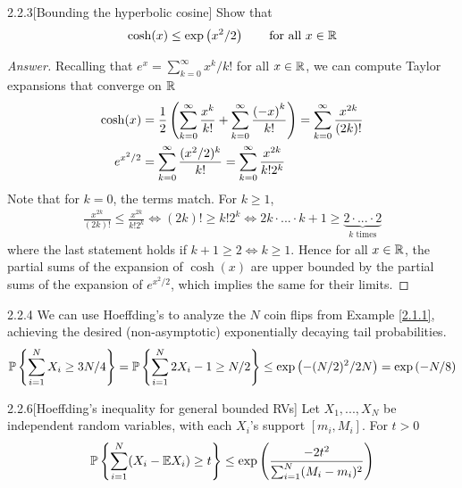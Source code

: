 {\begin{ex}{2.2.3}[Bounding the hyperbolic cosine]\label{2.2.3}
Show that
\begin{align*} 
    \cosh(x) \leq \exp\left(x^2/2\right) \qquad\text{for all $x\in \mathbb{R}$}
\end{align*}
\end{ex}
\begin{proof}[Answer]
    Recalling that $e^x = \sum_{k=0}^\infty x^k/k!$ for all $x\in \mathbb{R}$, we can compute Taylor expansions that converge on $\mathbb{R}$
\begin{align*}
    \cosh(x) &= \frac 1 2 \left(\sum_{k=0}^\infty \frac {x^k} {k!} + \sum_{k=0}^\infty \frac {{(-x)}^k} {k!} \right) = \sum_{k=0}^\infty \frac {x^{2k}} {(2k)!} \\
    e^{x^2/2} &= \sum_{k=0}^\infty \frac {(x^2/2)^k} {k!} = \sum_{k=0}^\infty \frac {x^{2k}}{k! 2^k}
\end{align*}
Note that for $k=0$, the terms match. For $k \geq 1$, 
\begin{align*}
    \frac {x^{2k}} {(2k)!} \le \frac {x^{2k}} {k!2^k} \iff (2k)! \geq k!2^k \iff 2k \cdot ... \cdot k+1 \geq \underbrace{2 \cdot ... \cdot 2}_{\text{$k$ times}}
\end{align*}
where the last statement holds if $k+1 \geq 2 \iff k \geq 1$. Hence for all $x \in \mathbb{R}$, the partial sums of the expansion of $\cosh(x)$ are upper bounded by the partial sums of the expansion of $e^{x^2/2}$, which implies the same for their limits.
\end{proof}

\begin{rmk}{2.2.4} We can use Hoeffding's to analyze the $N$ coin flips from Example \ref{2.1.1}, achieving the desired (non-asymptotic) exponentially decaying tail probabilities.
\begin{align*}
    \mathbb{P} \left\{\sum_{i=1}^N X_i \geq 3N/4\right\} = \mathbb{P} \left\{\sum_{i=1}^N 2X_i -1 \geq N/2\right\} \leq \exp\left(-(N/2)^2/2N\right) = \exp \left(-N/8\right)
\end{align*}
\end{rmk}

\begin{thm}{2.2.6}[Hoeffding's inequality for general bounded RVs] \label{2.2.6}
Let $X_1,...,X_N$ be independent random variables, with each $X_i$'s support $[m_i, M_i]$. For $t>0$
\begin{align*}
    \mathbb{P} \left\{\sum_{i=1}^N (X_i - \mathbb{E} X_i) \geq t\right\} \leq \exp\left( \frac {-2t^2}{\sum_{i=1}^N (M_i - m_i)^2}\right)
    \end{align*}
\end{thm}

}
